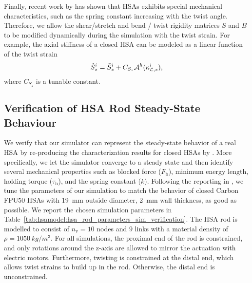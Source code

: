 Finally, recent work by \citet{good2022expanding} has shown that \glspl{HSA} exhibits special mechanical characteristics, such as the spring constant increasing with the twist angle. Therefore, we allow the shear/stretch and bend / twist rigidity matrices $S$ and $B$ to be modified dynamically during the simulation with the twist strain. For example, the axial stiffness of a closed \gls{HSA} can be modeled as a linear function of the twist strain~\citep{good2022expanding}
\begin{equation}
    \hat{S}_{z}^i = \Bar{S}_{z}^i + C_{S_z} \mathcal{A}^h(\kappa_{\mathcal{L},z}^i),
\end{equation}
where $C_{S_z}$ is a tunable constant.

\subsection{Verification of HSA Rod Steady-State Behaviour}\label{sub:hsamodel:hsa_robot_simulation:verification_good}
We verify that our simulator can represent the steady-state behavior of a real \gls{HSA} by re-producing the characterization results for closed \glspl{HSA} by \citet{good2022expanding}.
More specifically, we let the simulator converge to a steady state and then identify several mechanical properties such as blocked force ($F_\mathrm{b}$), minimum energy length, holding torque ($\tau_\mathrm{h}$), and the spring constant ($k$).
Following the reporting in \citep{good2022expanding}, we tune the parameters of our simulation to match the behavior of closed Carbon FPU50 \glspl{HSA} with \SI{19}{mm} outside diameter, \SI{2}{mm} wall thickness, as good as possible. We report the chosen simulation parameters in Table~\ref{tab:hsamodel:hsa_rod_parameters_sim_verification}. 
The \gls{HSA} rod is modelled to consist of $n_\mathrm{v} = 10$ nodes and $9$ links with a material density of $\rho = \SI{1050}{kg \per m^3}$. For all simulations, the proximal end of the rod is constrained, and only rotations around the z-axis are allowed to mirror the actuation with electric motors. Furthermore, twisting is constrained at the distal end, which allows twist strains to build up in the rod. Otherwise, the distal end is unconstrained.

